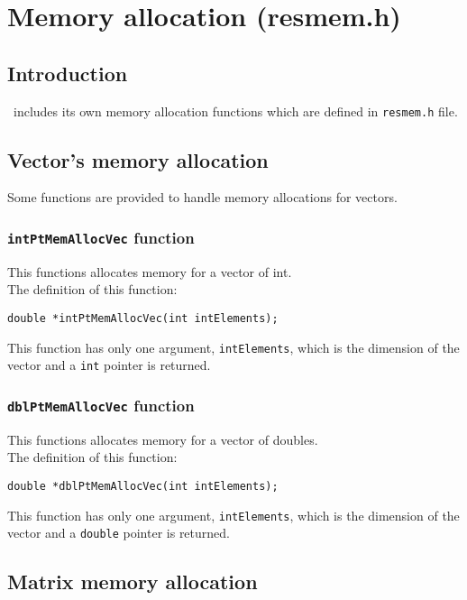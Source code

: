%
%

\chapter{Memory allocation (resmem.h)}

\section{Introduction}

\BI\ includes its own memory allocation functions which are defined in \texttt{resmem.h} file.

\section{Vector's memory allocation}

Some functions are provided to handle memory allocations for vectors.

\subsection{\texttt{intPtMemAllocVec} function} \label{sec:intPtMemAllocVec}

This functions allocates memory for a vector of int.\\

The definition of this function:
%
\begin{verbatim}
double *intPtMemAllocVec(int intElements);  
\end{verbatim}
%
This function has only one argument, \texttt{intElements}, which is the dimension of the vector and a \texttt{int} pointer is returned.

\subsection{\texttt{dblPtMemAllocVec} function} \label{sec:dblPtMemAllocVec}

This functions allocates memory for a vector of doubles.\\

The definition of this function:
%
\begin{verbatim}
double *dblPtMemAllocVec(int intElements);  
\end{verbatim}
%
This function has only one argument, \texttt{intElements}, which is the dimension of the vector and a \texttt{double} pointer is returned.

\section{Matrix memory allocation}

